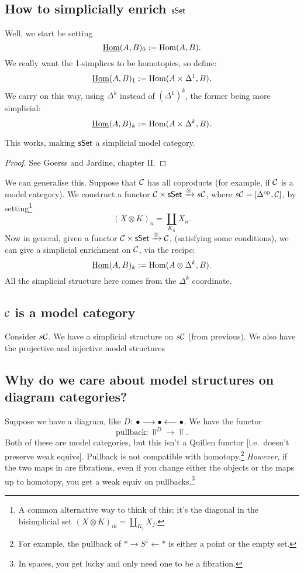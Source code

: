 \documentclass[11pt]{article}
\begin{document}
\begin{InnaSimplicalModelCats}
\subsection*{How to simplicially enrich $\operatorname{{\mathsf{sSet}}}$}
Well, we start be setting 
\[\underline{\operatorname{Hom}}(A,B)_0:=\operatorname{Hom}(A,B).\]
We really want the 1-simplices to be homotopies, so define:
\[\underline{\operatorname{Hom}}(A,B)_1:=\operatorname{Hom}(A\times\Delta^1,B).\]
We carry on this way, using $\Delta^k$ instead of $(\Delta^1)^k$, the former being more simplicial:
\[\underline{\operatorname{Hom}}(A,B)_k:=\operatorname{Hom}(A\times\Delta^k,B).\]
\begin{thm*}[Quillen?]
This works, making $\operatorname{{\mathsf{sSet}}}$ a simplicial model category.
\end{thm*}
\begin{proof} See Goerss and Jardine, chapter II.
\end{proof}
We can generalise this. Suppose that $\mathcal{C}$ has all coproducts (for example, if $\mathcal{C}$ is a model category). We construct a functor $\mathcal{C}\times\operatorname{{\mathsf{sSet}}}\xrightarrow{\otimes}s\mathcal{C}$, where $s\mathcal{C}=[\Delta^{\textup{op}},\mathcal{C}]$, by setting\footnote{A common alternative way to think of this: it's the diagonal in the bisimplicial set $(X\otimes K)_{ik}=\coprod_{K_i}X_j$.} 
\[(X\otimes K)_n=\coprod_{K_n}X_n.\]
Now in general, given a functor $\mathcal{C}\times\operatorname{{\mathsf{sSet}}}\xrightarrow{\otimes}\mathcal{C}$, (satisfying some conditions), we can give a simplicial enrichment on $\mathcal{C}$, via the recipe:
\[\underline{\operatorname{Hom}}(A,B)_k:=\operatorname{Hom}(A\otimes\Delta^k,B).\]
All the simplicial structure here comes from the $\Delta^k$ coordinate.

\subsection*{$\mathcal{C}$ is a model category}
Consider $s\mathcal{C}$. We have a simplicial structure on $s\mathcal{C}$ (from previous). We also have the projective and injective model structures
\subsection*{Why do we care about model structures on diagram categories?}
Suppose we have a diagram, like $D$: $\bullet\longrightarrow\bullet\longleftarrow\bullet$.  We have the functor
\[\text{pullback}:\Top^D\to\Top.\]
Both of these are model categories, but this isn't a Quillen functor [i.e.\ doesn't preserve weak equivs]. Pullback is not compatible with homotopy.\footnote{For example, the pullback of $\ast\longrightarrow S^1\longleftarrow\ast$ is either a point or the empty set.} \emph{However}, if the two maps in are fibrations, even if you change either the objects or the maps up to homotopy, you get a weak equiv on pullbacks.\footnote{In spaces, you get lucky and only need one to be a fibration.}


\end{InnaSimplicalModelCats}
\end{document}
